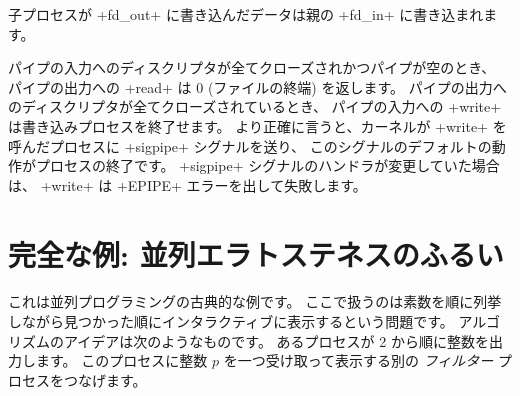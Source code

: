 \begin{example}
%
\begin{myimage}[width="45\%"]
\end{myimage}
%
子プロセスが \ml+fd_out+ に書き込んだデータは親の \ml+fd_in+ に書き込まれます。
\end{example}
パイプの入力へのディスクリプタが全てクローズされかつパイプが空のとき、
パイプの出力への \ml+read+ は 0 (ファイルの終端) を返します。
パイプの出力へのディスクリプタが全てクローズされているとき、
パイプの入力への \ml+write+ は書き込みプロセスを終了せます。
より正確に言うと、カーネルが \ml+write+ を呼んだプロセスに \ml+sigpipe+ シグナルを送り、
このシグナルのデフォルトの動作がプロセスの終了です。
\ml+sigpipe+ シグナルのハンドラが変更していた場合は、 \ml+write+ は \ml+EPIPE+ エラーを出して失敗します。

\section{\label{ex/crible}完全な例: 並列エラトステネスのふるい}

これは並列プログラミングの古典的な例です。
ここで扱うのは素数を順に列挙しながら見つかった順にインタラクティブに表示するという問題です。
アルゴリズムのアイデアは次のようなものです。
あるプロセスが 2 から順に整数を出力します。
このプロセスに整数 $p$ を一つ受け取って表示する別の \emph{フィルター} プロセスをつなげます。


